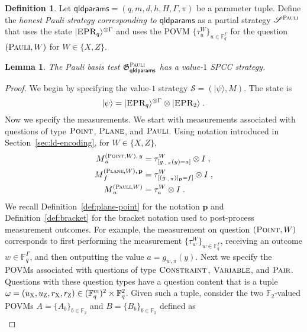 \documentclass[11pt]{article}
\newtheorem{lemma}[theorem]{Lemma}
\theoremstyle{definition}
\newtheorem{definition}[theorem]{Definition}
\newcommand{\ket}[1]{|#1\rangle}
\newcommand{\F}{\ensuremath{\mathbb{F}}}
\newcommand{\pl}{\mathbf{p}}
\newcommand{\game}{\mathfrak{G}}
\newcommand{\strategy}{\mathscr{S}}
\newcommand{\gamestyle}[1]{\ensuremath{\textsc{#1}}\xspace}
\newcommand{\pauli}{\gamestyle{Pauli}}
\newcommand{\labelstyle}[1]{\ensuremath{\textsc{#1}}\xspace}
\newcommand{\EPR}{\labelstyle{EPR}}
\newcommand{\xpt}{\labelstyle{X}}
\newcommand{\zpt}{\labelstyle{Z}}
\newcommand{\typestyle}[1]{\ensuremath{\textsc{#1}}\xspace}
\newcommand{\Plane}{\typestyle{Plane}}
\newcommand{\Point}{\typestyle{Point}}
\newcommand{\Pair}{\typestyle{Pair}}
\newcommand{\Constraint}{\typestyle{Constraint}}
\newcommand{\Variable}{\typestyle{Variable}}
\newcommand{\Pauli}{\typestyle{Pauli}}
\newcommand{\qldparams}{\mathsf{qldparams}}
\begin{document}
\begin{definition}
  \label{def:honest-pauli-strategy}
  Let $\qldparams = (q,m,d,h,H,\Gamma,\pi)$ be a parameter tuple.
  Define the \emph{honest Pauli strategy corresponding to $\qldparams$} as a
  partial strategy $\strategy^\pauli$ that uses the state $\ket{\EPR_q}^{\otimes
    \Gamma}$ and uses the POVM $\{\tau^W_u\}_{u\in \F_q^{\Gamma}}$ for the
  question $(\Pauli, W)$ for $W\in \{X,Z\}$.
\end{definition}

\begin{lemma}\label{lem:pauli-completeness}
  The Pauli basis test $\game^\pauli_\qldparams$ has a value-$1$ SPCC strategy.
\end{lemma}

\begin{proof}
  We begin by specifying the value-$1$ strategy $\strategy = (\ket{\psi}, M)$.
  The state is
  \begin{equation*}
    \ket{\psi} = \ket{\EPR_q}^{\otimes \Gamma} \otimes \ket{\EPR_2}\;.
  \end{equation*}
  Now we specify the measurements.
  We start with measurements associated with questions of type $\Point$,
  $\Plane$, and $\Pauli$.
  Using notation introduced in Section~\ref{sec:ld-encoding}, for $W \in \{X,
  Z\}$,
  \begin{align*}
    M^{(\Point,W),\, y}_{\, a}
    & = \tau^W_{[g_{\cdot,\, \pi}(y) = a]} \otimes I\;,\\
    M^{(\Plane,W),\, \pl}_{\, f}
    & = \tau^W_{[(g_{\cdot,\, \pi})|_\pl = f]} \otimes I\;,\\
    M^{(\Pauli,W)}_{\, a}
    & = \tau^W_{a} \otimes I\;.
  \end{align*}
  We recall  Definition~\ref{def:plane-point} for the notation $\pl$ and Definition~\ref{def:bracket} for the bracket notation used to post-process measurement outcomes.
  For example, the measurement on question $(\Point,W)$
  corresponds to first performing the measurement $\{\tau^W_w\}_{w \in \F_q^\Gamma}$,
  receiving an outcome $w \in \F_q^\Gamma$,
  and then outputting the value $a = g_{w, \pi}(y)$.  
  Next we specify the POVMs associated with questions of type $\Constraint$,
  $\Variable$, and $\Pair$.
  Questions with these question types have a question content that is a tuple
  $\omega= (u_\xpt, u_\zpt, r_\xpt, r_\zpt)\in (\F_q^m)^2 \times \F_q^2$.
  Given such a tuple, consider the two $\F_2$-valued POVMs $A=\{A_b\}_{b \in
    \F_2}$ and $B=\{B_b\}_{b \in \F_2}$ defined as
  \begin{align}

\end{align}
\end{proof}
\end{document}

